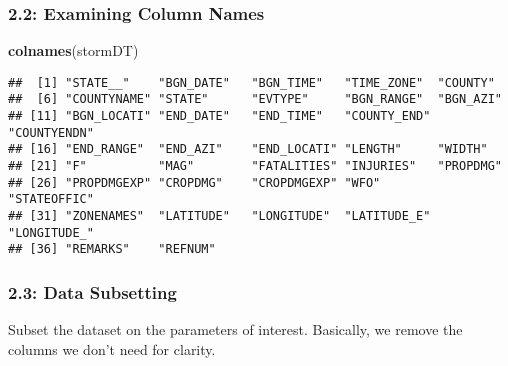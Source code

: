 \documentclass[]{article}
\newenvironment{Shaded}{\begin{snugshade}}{\end{snugshade}}
\newcommand{\KeywordTok}[1]{\textcolor[rgb]{0.13,0.29,0.53}{\textbf{#1}}}
\newcommand{\NormalTok}[1]{#1}
\begin{document}
\subsubsection{2.2: Examining Column
Names}\label{examining-column-names}

\begin{Shaded}
\begin{Highlighting}[]
\KeywordTok{colnames}\NormalTok{(stormDT)}
\end{Highlighting}
\end{Shaded}

\begin{verbatim}
##  [1] "STATE__"    "BGN_DATE"   "BGN_TIME"   "TIME_ZONE"  "COUNTY"    
##  [6] "COUNTYNAME" "STATE"      "EVTYPE"     "BGN_RANGE"  "BGN_AZI"   
## [11] "BGN_LOCATI" "END_DATE"   "END_TIME"   "COUNTY_END" "COUNTYENDN"
## [16] "END_RANGE"  "END_AZI"    "END_LOCATI" "LENGTH"     "WIDTH"     
## [21] "F"          "MAG"        "FATALITIES" "INJURIES"   "PROPDMG"   
## [26] "PROPDMGEXP" "CROPDMG"    "CROPDMGEXP" "WFO"        "STATEOFFIC"
## [31] "ZONENAMES"  "LATITUDE"   "LONGITUDE"  "LATITUDE_E" "LONGITUDE_"
## [36] "REMARKS"    "REFNUM"
\end{verbatim}

\subsubsection{2.3: Data Subsetting}\label{data-subsetting}

Subset the dataset on the parameters of interest. Basically, we remove
the columns we don't need for clarity.
\end{document}
